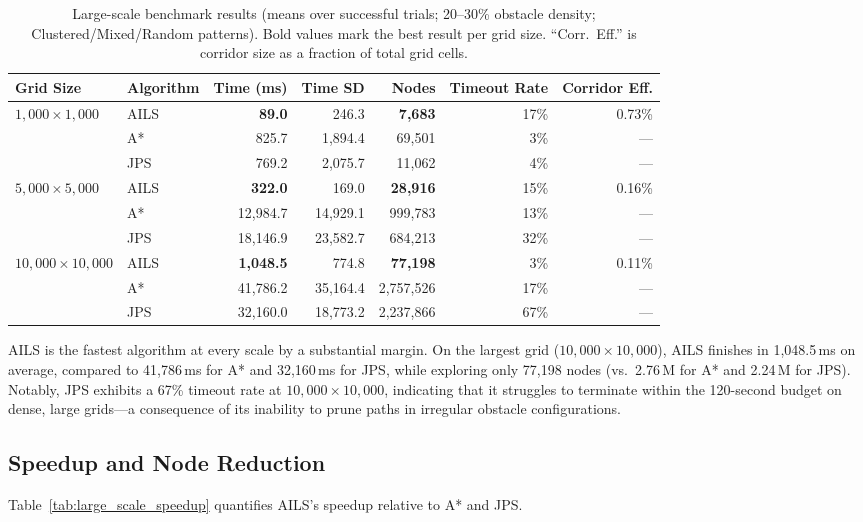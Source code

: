 \documentclass[journal]{IEEEtran}
\begin{document}
\begin{table}[t]
\centering
\caption{Large-scale benchmark results (means over successful trials; 20--30\% obstacle density; Clustered/Mixed/Random patterns). Bold values mark the best result per grid size. ``Corr.\ Eff.'' is corridor size as a fraction of total grid cells.}
\label{tab:large_scale_perf}
\begin{tabular}{llrrrrr}
\toprule
Grid Size & Algorithm & Time (ms) & Time SD & Nodes & Timeout Rate & Corridor Eff. \\
\midrule
\multirow{3}{*}{$1{,}000{\times}1{,}000$}
 & AILS & \textbf{89.0} & 246.3 & \textbf{7,683} & 17\% & 0.73\% \\
 & A*   & 825.7 & 1,894.4 & 69,501 & 3\%  & --- \\
 & JPS  & 769.2 & 2,075.7 & 11,062 & 4\%  & --- \\
\midrule
\multirow{3}{*}{$5{,}000{\times}5{,}000$}
 & AILS & \textbf{322.0} & 169.0 & \textbf{28,916} & 15\% & 0.16\% \\
 & A*   & 12,984.7 & 14,929.1 & 999,783 & 13\% & --- \\
 & JPS  & 18,146.9 & 23,582.7 & 684,213 & 32\% & --- \\
\midrule
\multirow{3}{*}{$10{,}000{\times}10{,}000$}
 & AILS & \textbf{1,048.5} & 774.8 & \textbf{77,198} & 3\%  & 0.11\% \\
 & A*   & 41,786.2 & 35,164.4 & 2,757,526 & 17\% & --- \\
 & JPS  & 32,160.0 & 18,773.2 & 2,237,866 & 67\% & --- \\
\bottomrule
\end{tabular}
\end{table}

AILS is the fastest algorithm at every scale by a substantial margin.
On the largest grid ($10{,}000{\times}10{,}000$), AILS finishes in 1,048.5\,ms on average, compared to 41,786\,ms for A* and 32,160\,ms for JPS, while exploring only 77,198 nodes (vs.\ 2.76\,M for A* and 2.24\,M for JPS).
Notably, JPS exhibits a 67\% timeout rate at $10{,}000{\times}10{,}000$, indicating that it struggles to terminate within the 120-second budget on dense, large grids---a consequence of its inability to prune paths in irregular obstacle configurations.

\subsection{Speedup and Node Reduction}

Table~\ref{tab:large_scale_speedup} quantifies AILS's speedup relative to A* and JPS.
\end{document}
